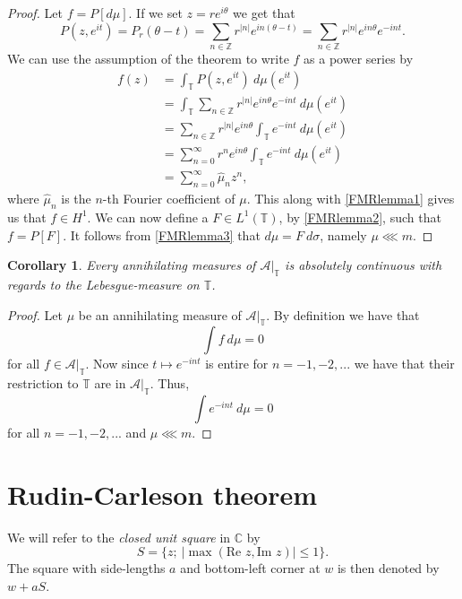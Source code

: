 \documentclass[a4paper,12pt,twoside,BCOR=10mm]{scrbook}
\newtheorem{corollary}[theorem]{Corollary}
\theoremstyle{definition}
\theoremstyle{definition}
\theoremstyle{definition}
\renewcommand{\Re}{\text{Re }}
\renewcommand{\Im}{\text{Im }}
\begin{document}
\begin{proof}
Let $f = P[d\mu]$.
If we set $z = re^{i\theta}$ we get that
\[
	P(z, e^{it})
		= P_r(\theta - t)
		= \sum_{n \in \mathbb{Z}} r^{|n|}e^{in(\theta - t)}
		= \sum_{n \in \mathbb{Z}} r^{|n|}e^{in\theta}e^{-int}.
\]
We can use the assumption of the theorem to write $f$ as a power series by
\begin{align*}
	f(z) 
	&= \int_{\mathbb{T}} P(z, e^{it})\ d\mu(e^{it}) \\
	&= \int_{\mathbb{T}} \sum_{n \in \mathbb{Z}} r^{|n|}e^{in\theta}e^{-int}\ d\mu(e^{it}) \\
	&= \sum_{n \in \mathbb{Z}} r^{|n|}e^{in\theta} \int_{\mathbb{T}} e^{-int}\ d\mu(e^{it}) \\
	&= \sum_{n = 0}^{\infty} r^n e^{in\theta} \int_{\mathbb{T}} e^{-int}\ d\mu(e^{it}) \\
	&= \sum_{n = 0}^{\infty} \hat{\mu}_n z^n,
\end{align*}
where $\hat{\mu}_n$ is the $n$-th Fourier coefficient of $\mu$.
This along with \ref{FMRlemma1} gives us that $f \in H^1$.
We can now define a $F \in L^1(\mathbb{T})$, by \ref{FMRlemma2}, such that $f = P[F]$.
It follows from \ref{FMRlemma3} that $d\mu = F\ d\sigma$, namely $\mu \lll m$.
\end{proof}
\begin{corollary}
\label{fmrieszcor}
Every annihilating measures of $\mathcal{A}|_{\mathbb{T}}$ is absolutely continuous with regards to the Lebesgue-measure on $\mathbb{T}$.
\end{corollary}
\begin{proof}
Let $\mu$ be an annihilating measure of $\mathcal{A}|_{\mathbb{T}}$.
By definition we have that
\[
	\int f\ d\mu = 0
\]
for all $f \in \mathcal{A}|_{\mathbb{T}}$.
Now since $t \mapsto e^{-int}$ is entire for $n = -1, -2, ...$ we have that their restriction to $\mathbb{T}$ are in $\mathcal{A}|_{\mathbb{T}}$.
Thus,
\[
	\int e^{-int}\ d\mu = 0
\]
for all $n = -1, -2, ...$ and $\mu \lll m$.
\end{proof}



\section{Rudin-Carleson theorem}
\label{section2}
We will refer to the \emph{closed unit square} in $\mathbb{C}$ by
\[
	S = \{z;\ |\max(\Re z, \Im z)| \leq 1\}.
\]
The square with side-lengths $a$ and bottom-left corner at $w$ is then denoted by $w + aS$.
\end{document}

